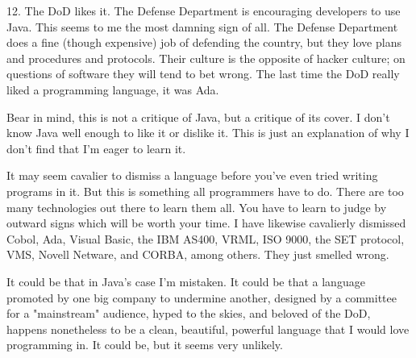 12.
                  The DoD likes it. The Defense Department is encouraging
                  developers to use Java. This seems to me the most damning sign
                  of all. The Defense Department does a fine (though expensive)
                  job of defending the country, but they love plans and
                  procedures and protocols. Their culture is the opposite of
                  hacker culture; on questions of software they will tend to bet
                  wrong. The last time the DoD really liked a programming
                  language, it was Ada.


                  Bear in mind, this is not a critique of Java, but a critique
                  of its cover. I don't know Java well enough to like it or
                  dislike it. This is just an explanation of why I don't find
                  that I'm eager to learn it.

It may seem cavalier to
                  dismiss a language before you've even tried writing programs
                  in it. But this is something all programmers have to do. There
                  are too many technologies out there to learn them all. You
                  have to learn to judge by outward signs which will be worth
                  your time. I have likewise cavalierly dismissed Cobol, Ada,
                  Visual Basic, the IBM AS400, VRML, ISO 9000, the SET protocol,
                  VMS, Novell Netware, and CORBA, among others. They just
                  smelled wrong.

It could be that in Java's case I'm
                  mistaken. It could be that a language promoted by one big
                  company to undermine another, designed by a committee for a
                  "mainstream" audience, hyped to the skies, and beloved of the
                  DoD, happens nonetheless to be a clean, beautiful, powerful
                  language that I would love programming in. It could be, but it
                  seems very unlikely.


              
            
          
